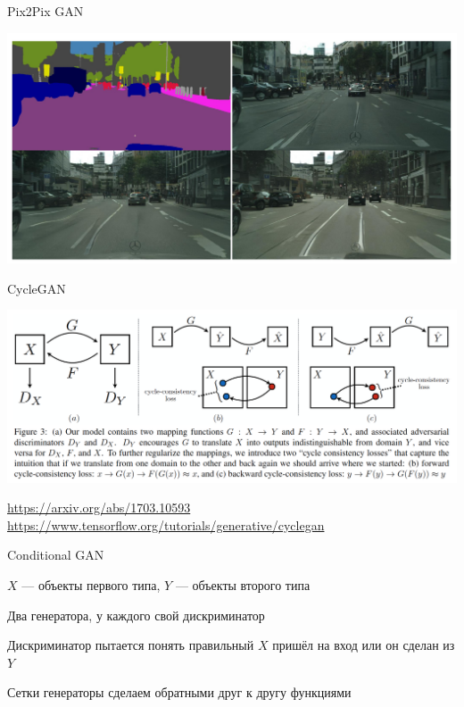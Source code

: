 \documentclass[notes,12pt, aspectratio=169]{beamer}
\newenvironment{wideitemize}{\itemize\addtolength{\itemsep}{10pt}}{\enditemize}
\begin{document}
\begin{frame}{Pix2Pix GAN}
\begin{center}
	\includegraphics[width=.85\linewidth]{video.png}
\end{center}
\end{frame}


\begin{frame}{CycleGAN}
\begin{center}
	\includegraphics[width=.9\linewidth]{cyclegan.png}
\end{center}
\vfill
\footnotesize
{\color{blue} \url{https://arxiv.org/abs/1703.10593}} \\ 
{\color{blue} \url{https://www.tensorflow.org/tutorials/generative/cyclegan}} 
\end{frame}

\begin{frame}{Conditional GAN}
\begin{wideitemize}
	\item   $X$ — объекты первого типа, $Y$ — объекты второго типа 
	\item   Два генератора, у каждого свой дискриминатор 
	\item   Дискриминатор пытается понять правильный $X$ пришёл на вход или он сделан из $Y$ 
	\item   Сетки генераторы сделаем обратными друг к другу функциями
\end{wideitemize}
\end{frame}
\end{document}
